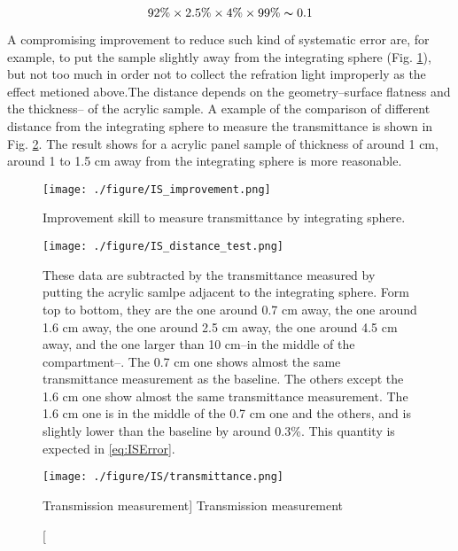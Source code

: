 \begin{equation}
\label{eq:ISError}
92\%\times2.5\%\times4\%\times99\%\thicksim0.1%
\end{equation}


A compromising improvement to reduce such kind of systematic error are, for example,
to put the sample slightly away from the integrating sphere (Fig. \ref{fig:IS_improvement.png}), but not too much in
order not to collect the refration light improperly as the effect metioned above.The distance depends on the geometry--surface flatness and
the thickness-- of the acrylic sample.  A example of the comparison of different distance from
the integrating sphere to measure the transmittance is shown in Fig. \ref{fig:IS_distance_test.png}. The result shows for a acrylic panel
sample of thickness of around 1 cm, around 1 to 1.5 cm away from the integrating sphere is more reasonable.


\begin{figure}
    \centering
    \texttt{[image: ./figure/IS\_improvement.png]}
    \caption{Improvement skill to measure transmittance by integrating sphere.}
    \label{fig:IS_improvement.png}
    \end{figure}


\begin{figure}
    \centering
    \texttt{[image: ./figure/IS\_distance\_test.png]}
    \caption[Example of transmittance measured in different distance from the integrating sphere.]
{
These data are subtracted by the transmittance measured by putting the acrylic samlpe adjacent to the integrating sphere.
Form top to bottom, they are the one around 0.7 cm away, the one around 1.6 cm away, the one around 2.5 cm away, the one around 4.5 cm away,
and the one larger than 10 cm--in the middle of the compartment--. The 0.7 cm one shows almost the same transmittance measurement as the baseline.
The others except the 1.6 cm one show almost the same transmittance measurement. The 1.6 cm one is in the middle of the 0.7 cm one and the others,
and is slightly lower than the baseline by around 0.3\%. This quantity is expected in \ref{eq:ISError}.
}
    \label{fig:IS_distance_test.png}
    \end{figure}



\begin{figure}
    \centering
    \texttt{[image: ./figure/IS/transmittance.png]}
    \caption
    [Transmission measurement]
    {Transmission measurement}
    \label{fig:transmission.png}
    \end{figure}




